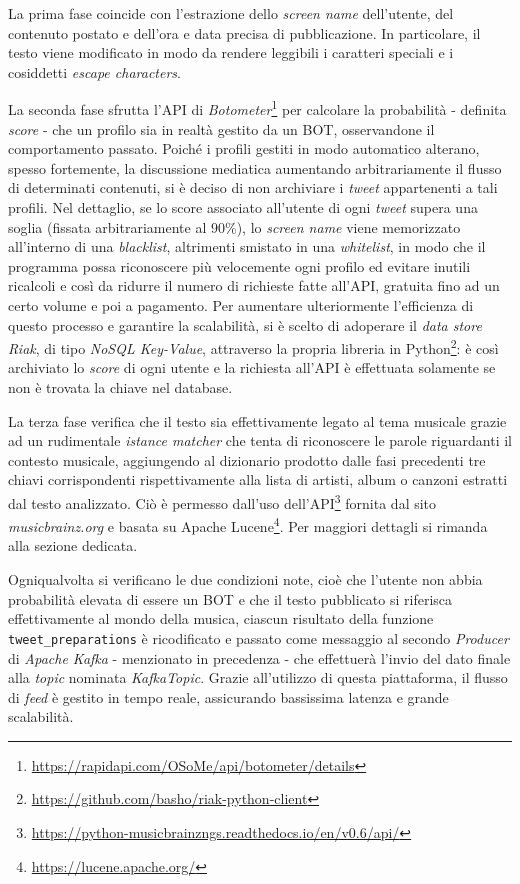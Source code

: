 \documentclass[12pt, a4paper, twocolumn]{article} %
\begin{document}
La prima fase coincide con l'estrazione dello \textit{screen name} dell'utente, del contenuto postato e dell'ora e data precisa di pubblicazione. 
In particolare, il testo viene modificato in modo da rendere leggibili i caratteri speciali e i cosiddetti \textit{escape characters}. 

La seconda fase sfrutta l'API di \textit{Botometer}\footnote{\url{https://rapidapi.com/OSoMe/api/botometer/details}} per calcolare la probabilità - definita \textit{score} - che un profilo sia in realtà gestito da un BOT, osservandone il comportamento passato.
Poiché i profili gestiti in modo automatico alterano, spesso fortemente, la discussione mediatica aumentando arbitrariamente il flusso di determinati contenuti, si è deciso di non archiviare i \textit{tweet} appartenenti a tali profili. 
Nel dettaglio, se lo score associato all'utente di ogni \textit{tweet} supera una soglia (fissata arbitrariamente al $90\%$), lo \textit{screen name} viene memorizzato all'interno di una \textit{blacklist}, altrimenti smistato in una \textit{whitelist}, in modo che il programma possa riconoscere più velocemente ogni profilo ed evitare inutili ricalcoli e così da ridurre il numero di richieste fatte all'API, gratuita fino ad un certo volume e poi a pagamento.
Per aumentare ulteriormente l'efficienza di questo processo e garantire la scalabilità, si è scelto di adoperare il \textit{data store Riak}, di tipo \textit{NoSQL Key-Value}, attraverso la propria libreria in Python\footnote{\url{https://github.com/basho/riak-python-client}}: è così archiviato lo \textit{score} di ogni utente e la richiesta all'API è effettuata solamente se non è trovata la chiave nel database.

La terza fase verifica che il testo sia effettivamente legato al tema musicale grazie ad un rudimentale \textit{istance matcher} che tenta di riconoscere le parole riguardanti il contesto musicale, aggiungendo al dizionario prodotto dalle fasi precedenti tre chiavi corrispondenti rispettivamente alla lista di artisti, album o canzoni estratti dal testo analizzato.
Ciò è permesso dall'uso dell'API\footnote{\url{https://python-musicbrainzngs.readthedocs.io/en/v0.6/api/}} fornita dal sito \textit{musicbrainz.org} e basata su Apache Lucene\footnote{\url{https://lucene.apache.org/}}.
Per maggiori dettagli si rimanda alla sezione dedicata.

Ogniqualvolta si verificano le due condizioni note, cioè che l'utente non abbia probabilità elevata di essere un BOT e che il testo pubblicato si riferisca effettivamente al mondo della musica, ciascun risultato della funzione \verb|tweet_preparations| è ricodificato e passato come messaggio al secondo \textit{Producer} di \textit{Apache Kafka} - menzionato in precedenza - che effettuerà l'invio del dato finale alla \textit{topic} nominata \textit{KafkaTopic}. 
Grazie all'utilizzo di questa piattaforma, il flusso di \textit{feed} è gestito in tempo reale, assicurando bassissima latenza e grande scalabilità. 
\end{document}
